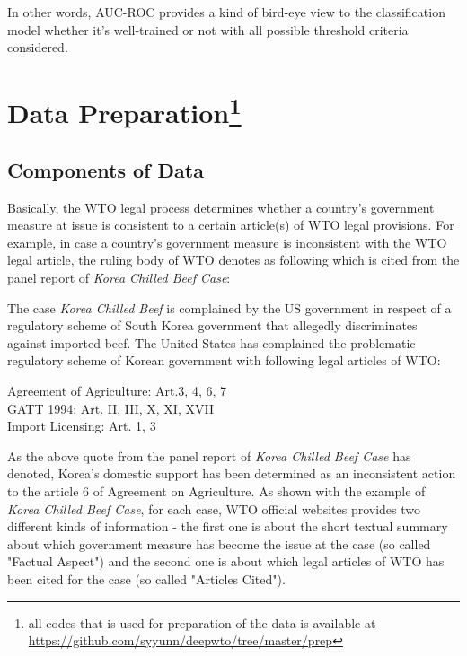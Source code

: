 \documentclass[sigconf]{acmart}
\begin{document}
In other words, AUC-ROC provides a kind of bird-eye view to the classification model whether it's well-trained or not with all possible threshold criteria considered.

\section{Data Preparation\protect\footnote{\MakeLowercase{All codes that is used for preparation of the data is available at \url{https://github.com/syyunn/DeepWTO/tree/master/prep}}}}
\subsection{Components of Data}

Basically, the WTO legal process determines whether a country's government measure at issue is consistent to a certain article(s) of WTO legal provisions. For example, in case a country's government measure is inconsistent with the WTO legal article, the ruling body of WTO denotes as following which is cited from the panel report of \textit{Korea Chilled Beef Case}:
\\
\begin{displayquote}{ "Korea\textquotesingle s domestic support for beef in 1997 and 1998 exceeded the de minimis level contrary to Article 6 of the Agreement on Agriculture."\\ 
\end{displayquote} The case \textit{Korea Chilled Beef} is complained by the US government in respect of a regulatory scheme of South Korea government that allegedly discriminates against imported beef. The United States has complained the problematic regulatory scheme of Korean government with following legal articles of WTO:\\
\begin{displayquote}
    Agreement of Agriculture: Art.3, 4, 6, 7\\
    GATT 1994: Art. II, III, X, XI, XVII\\
    Import Licensing: Art. 1, 3\\
\end{displayquote} As the above quote from the panel report of \textit{Korea Chilled Beef Case} has denoted, Korea's domestic support has been determined as an inconsistent action to the article 6 of Agreement on Agriculture. As shown with the example of \textit{Korea Chilled Beef Case}, for each case, WTO official websites provides two different kinds of information - the first one is about the short textual summary about which government measure has become the issue at the case (so called "Factual Aspect") and the second one is about which legal articles of WTO has been cited for the case (so called "Articles Cited").  
\end{document}
